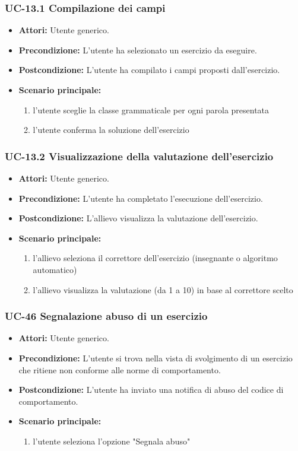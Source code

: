 	\subsubsection{UC-13.1 Compilazione dei campi}
		\begin{itemize}
			\item \textbf{Attori:} Utente generico.
			\item \textbf{Precondizione:} L'utente ha selezionato un esercizio da eseguire.
			\item \textbf{Postcondizione:} L'utente ha compilato i campi proposti dall'esercizio.
			\item \textbf{Scenario principale:}
				\begin{enumerate}
					\item l'utente sceglie la classe grammaticale per ogni parola presentata
					\item l'utente conferma la soluzione dell'esercizio
				\end{enumerate}
		\end{itemize}

	\subsubsection{UC-13.2 Visualizzazione della valutazione dell'esercizio}
	\begin{itemize}
			\item \textbf{Attori:} Utente generico.
			\item \textbf{Precondizione:} L'utente ha completato l'esecuzione dell'esercizio.
			\item \textbf{Postcondizione:} L'allievo visualizza la valutazione dell'esercizio.
			\item \textbf{Scenario principale:}
				\begin{enumerate}
					\item l'allievo seleziona il correttore dell'esercizio (insegnante o algoritmo automatico)
					\item l'allievo visualizza la valutazione (da 1 a 10) in base al correttore scelto
				\end{enumerate}
	\end{itemize}				

\subsubsection{UC-46 Segnalazione abuso di un esercizio}
	\begin{itemize}
		\item \textbf{Attori:} Utente generico.
		\item \textbf{Precondizione:} L'utente si trova nella vista di svolgimento di un esercizio che ritiene non conforme alle norme di comportamento.
		\item \textbf{Postcondizione:} L'utente ha inviato una notifica di abuso del codice di comportamento.
		\item \textbf{Scenario principale:}
		\begin{enumerate}
			\item l'utente seleziona l'opzione "Segnala abuso"
		\end{enumerate}
	\end{itemize}

